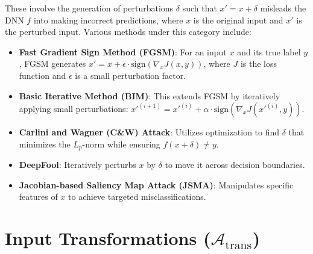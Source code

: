 \documentclass[10pt, conference, a4paper, final]{IEEEtran}
\begin{document}
These involve the generation of perturbations \( \delta \) such that \( x' = x + \delta \) misleads the DNN \( f \) into making incorrect predictions, where \( x \) is the original input and \( x' \) is the perturbed input. Various methods under this category include:
\begin{itemize}
    \item \textbf{Fast Gradient Sign Method (FGSM)}: For an input \( x \) and its true label \( y \), FGSM generates \( x' = x + \epsilon \cdot \text{sign}(\nabla_x J(x, y)) \), where \( J \) is the loss function and \( \epsilon \) is a small perturbation factor.
    \item \textbf{Basic Iterative Method (BIM)}: This extends FGSM by iteratively applying small perturbations: \( x'^{(i+1)} = x'^{(i)} + \alpha \cdot \text{sign}(\nabla_x J(x'^{(i)}, y)) \).
    \item \textbf{Carlini and Wagner (C\&W) Attack}: Utilizes optimization to find \( \delta \) that minimizes the \( L_p \)-norm while ensuring \( f(x + \delta) \neq y \).
    \item \textbf{DeepFool}: Iteratively perturbs \( x \) by \( \delta \) to move it across decision boundaries.
    \item \textbf{Jacobian-based Saliency Map Attack (JSMA)}: Manipulates specific features of \( x \) to achieve targeted misclassifications.
\end{itemize}

\section*{Input Transformations (\( \mathcal{A}_{\text{trans}} \))}
\end{document}
